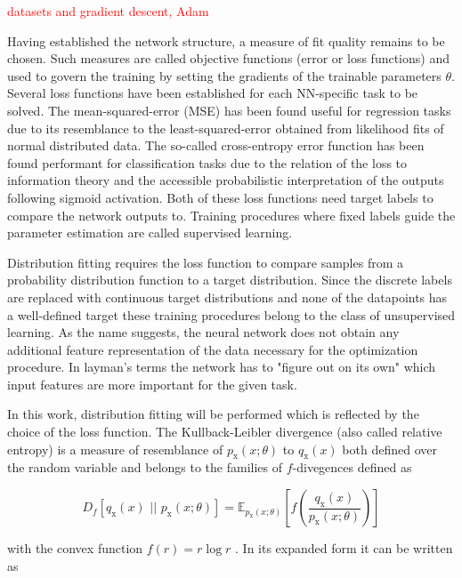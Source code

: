\textcolor{red}{datasets and gradient descent, Adam}


Having established the network structure, a measure of fit quality remains to be chosen. Such measures are called objective functions (error or loss functions) and used to govern the training by setting the gradients of the trainable parameters $\theta$.
Several loss functions have been established for each NN-specific task to be solved. The mean-squared-error (MSE) has been found useful for regression tasks due to its resemblance to the least-squared-error obtained from likelihood fits of normal distributed data. The so-called cross-entropy error function has been found performant for classification tasks due to the relation of the loss to information theory and the accessible probabilistic interpretation of the outputs following sigmoid activation. Both of these loss functions need target labels to compare the network outputs to. Training procedures where fixed labels guide the parameter estimation are called supervised learning.

Distribution fitting requires the loss function to compare samples from a probability distribution function to a target distribution. Since the discrete labels are replaced with continuous target distributions and none of the datapoints has a well-defined target these training procedures belong to the class of unsupervised learning. As the name suggests, the neural network does not obtain any additional feature representation of the data necessary for the optimization procedure. In layman's terms the network has to "figure out on its own" which input features are more important for the given task.

In this work, distribution fitting will be performed which is reflected by the choice of the loss function. The Kullback-Leibler divergence (also called relative entropy) is a measure of resemblance of $p_\text{x}(x; \theta)$ to $q_\text{x}(x)$ both defined over the random variable  and belongs to the families of $f$-divegences defined as

\begin{equation*}
	D_f\left[q_\text{x}(x) \, \, || \, \, p_\text{x}(x; \theta)\right] = \mathbb{E}_{p_\text{x}(x; \theta)}\left[f\left(\frac{q_\text{x}(x)}{p_\text{x}(x; \theta)}\right)\right]
\end{equation*}

with the convex function $f(r) = r\log r$ \cite{Papamakarios_NF}. In its expanded form it can be written as

